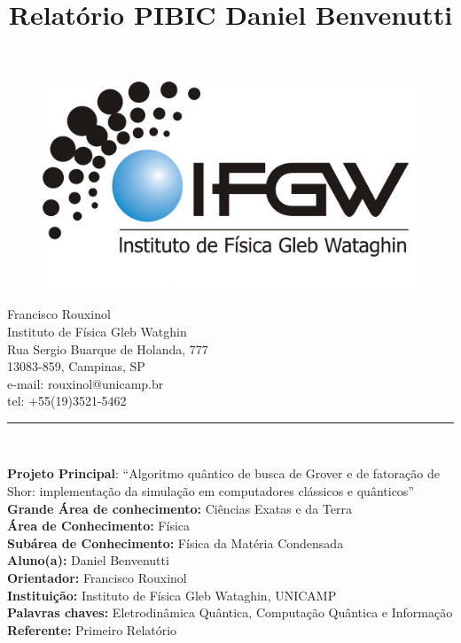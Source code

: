 \documentclass[12pt,a4paper]{article}
\title{Relatório PIBIC Daniel Benvenutti}
\makeatletter
\def\vhrulefill#1{\leavevmode\leaders\hrule\@height#1\hfill \kern\z@}
\makeatother
\begin{document}
\begin{figure}
\includegraphics[scale=0.111]{logo-documentos.png}
\end{figure}



\noindent 
\begin{flushright}
\begin{scriptsize}
Francisco Rouxinol \\
Instituto de Física Gleb Watghin\\
Rua Sergio Buarque de Holanda, 777\\
13083-859, Campinas, SP \\
e-mail: rouxinol@unicamp.br\\
tel: +55(19)3521-5462\\
\vhrulefill{1pt} \\ %
\end{scriptsize}
\end{flushright}




\begin{flushleft}
\textbf{Projeto Principal}: “Algoritmo quântico de busca de Grover e de fatoração de Shor: implementação da simulação em computadores clássicos e quânticos”\\
\textbf{Grande Área de conhecimento:} Ciências Exatas e da Terra\\
\textbf{Área de Conhecimento:} Física\\
\textbf{Subárea de Conhecimento: }Física da Matéria Condensada\\
\textbf{Aluno(a):} Daniel Benvenutti\\
\textbf{Orientador: }Francisco Rouxinol\\
\textbf{Instituição:} Instituto de Física Gleb Wataghin, UNICAMP\\
\textbf{Palavras chaves:} Eletrodinâmica Quântica, Computação Quântica e Informação\\
\textbf{Referente:} Primeiro Relatório
\end{flushleft}
\end{document}
